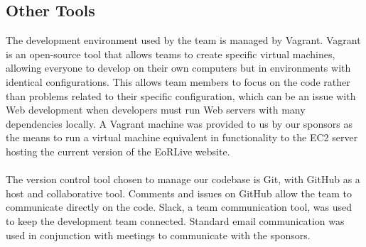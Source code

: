 \documentclass[12pt]{article}
\begin{document}
\begin{spacing}{1.5}
\subsection{Other Tools}
The development environment used by the team is managed by Vagrant. Vagrant is an open-source tool that allows teams to create specific virtual machines, allowing everyone to develop on their own computers but in environments with identical configurations. This allows team members to focus on the code rather than problems related to their specific configuration, which can be an issue with Web development when developers must run Web servers with many dependencies locally.  A Vagrant machine was provided to us by our sponsors as the means to run a virtual machine equivalent in functionality to the EC2 server hosting the current version of the EoRLive website.
\\ \\
The version control tool chosen to manage our codebase is Git, with GitHub as a host and collaborative tool. Comments and issues on GitHub allow the team to communicate directly on the code. Slack, a team communication tool, was used to keep the development team connected. Standard email communication was used in conjunction with meetings to communicate with the sponsors.


\end{spacing}
\end{document}
